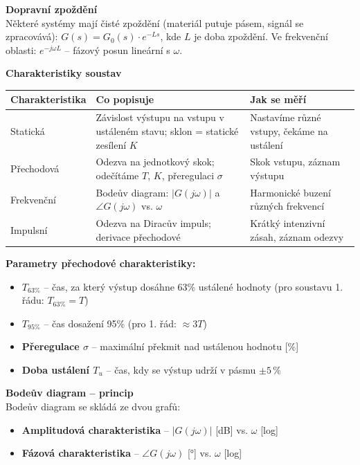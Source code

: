 \documentclass[a4paper,10pt]{article}
\begin{document}
\begin{vysvetlenibox}
\textbf{Dopravní zpoždění}\\
Některé systémy mají čisté zpoždění (materiál putuje pásem, signál se
zpracovává): $G(s) = G_0(s) \cdot e^{-Ls}$, kde $L$ je doba zpoždění.
Ve frekvenční oblasti: $e^{-j\omega L}$ -- fázový posun lineární s $\omega$.

\textbf{Charakteristiky soustav}

\begin{center}
\begin{tabularx}{0.95\linewidth}{@{} l X X @{}}
    \toprule
    \textbf{Charakteristika} & \textbf{Co popisuje} & \textbf{Jak se měří} \\
    \midrule
    Statická & Závislost výstupu na vstupu v ustáleném stavu;
               sklon = statické zesílení $K$
             & Nastavíme různé vstupy, čekáme na ustálení \\
    Přechodová & Odezva na jednotkový skok;
                 odečítáme $T$, $K$, přeregulaci $\sigma$
              & Skok vstupu, záznam výstupu \\
    Frekvenční & Bodeův diagram: $|G(j\omega)|$ a $\angle G(j\omega)$ vs. $\omega$
              & Harmonické buzení různých frekvencí \\
    Impulsní & Odezva na Diracův impuls; derivace přechodové
              & Krátký intenzivní zásah, záznam odezvy \\
    \bottomrule
\end{tabularx}
\end{center}

\textbf{Parametry přechodové charakteristiky:}
\begin{itemize}[noitemsep, leftmargin=1.4em, topsep=4pt]
    \item \textbf{$T_{63\%}$} -- čas, za který výstup dosáhne 63\% ustálené hodnoty
          (pro soustavu 1. řádu: $T_{63\%} = T$)
    \item \textbf{$T_{95\%}$} -- čas dosažení 95\% (pro 1. řád: $\approx 3T$)
    \item \textbf{Přeregulace $\sigma$} -- maximální překmit nad ustálenou hodnotu [\%]
    \item \textbf{Doba ustálení $T_u$} -- čas, kdy se výstup udrží v pásmu $\pm 5\,\%$
\end{itemize}

\textbf{Bodeův diagram -- princip}\\
Bodeův diagram se skládá ze dvou grafů:
\begin{itemize}[noitemsep, leftmargin=1.4em, topsep=4pt]
    \item \textbf{Amplitudová charakteristika} -- $|G(j\omega)|$ [dB] vs. $\omega$ [log]
    \item \textbf{Fázová charakteristika} -- $\angle G(j\omega)$ [°] vs. $\omega$ [log]
\end{itemize}


\end{vysvetlenibox}
\end{document}
